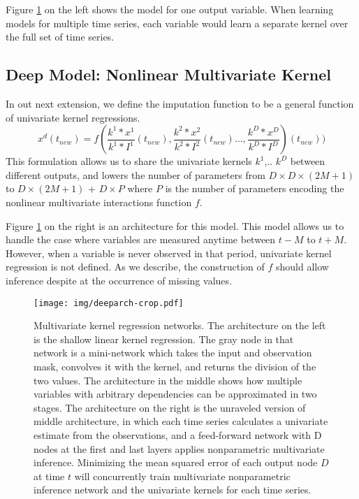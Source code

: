 \documentclass{article} %
\begin{document}
Figure \ref{fig:deepkr} on the left shows the model for one output variable. When learning models for multiple time series, each variable would learn a separate kernel over the full set of time series.

\subsection{Deep Model: Nonlinear Multivariate Kernel}

In out next extension, we define the imputation function to be a general function of univariate kernel regressions.
$$ x^d(t_{new})=f(\frac{k^1 \ast x^1}{k^1 \ast I^1}(t_{new}), \frac{k^2 \ast x^2}{k^2 \ast I^2}(t_{new})\dots ,\frac{k^D \ast x^D}{k^D \ast I^D})(t_{new}))$$
% 
This formulation allows us to share the univariate kernels $k^1$,.. $k^D$ between different outputs, and lowers the number of parameters from $D \times D \times (2M+1)$ to $D \times (2M+1)$ + $D \times P$ where $P$ is the number of parameters encoding the nonlinear multivariate interactions function $f$. 

Figure \ref{fig:deepkr} on the right is an architecture for this model. This model allows us to handle the case where variables are measured anytime between $t-M$ to $t+M$. However, when 
a variable is never observed in that period, univariate kernel regression is not defined. As we describe, the construction of $f$ should allow inference despite at the occurrence of missing values. 

\begin{figure}[h]
\begin{center}
\texttt{[image: img/deeparch-crop.pdf]}
\end{center}
\caption{Multivariate kernel regression networks. The architecture on the left is the shallow linear kernel regression. The gray node in that network is a mini-network which takes the input and observation mask, convolves it with the kernel, and returns the division of the two values. The architecture in the middle shows how multiple variables with arbitrary dependencies can be approximated in two stages. The architecture on the right is the unraveled version of middle architecture, in which each time series calculates a univariate estimate from the observations, and a feed-forward network with D nodes at the first and last layers applies nonparametric multivariate inference. Minimizing the mean squared error of each output node $D$ at time $t$ will concurrently train multivariate nonparametric inference network and the univariate kernels for each time series.}\label{fig:deepkr}
\end{figure}
\end{document}
